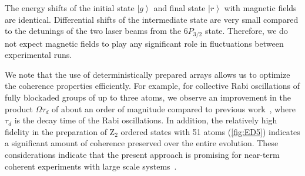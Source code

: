 \documentclass[prl,nobalancelastpage,twocolumn,superscriptaddress,nofootinbib]{revtex4}
\newcommand{\ket}[1]{\left|#1\right\rangle}
\begin{document}
\begin{footnotesize}
\begin{itemize}
The energy shifts of the initial state $\ket{g}$ and final state $\ket{r}$ with
magnetic fields are identical. Differential shifts of the intermediate state
are very small compared to the detunings of the two laser beams from the
$6P_{3/2}$ state. Therefore, we do not expect magnetic fields to play any
significant role in fluctuations between experimental runs.
\end{itemize}

We note that the use of deterministically prepared arrays allows us to
optimize the coherence properties efficiently. For example, for collective Rabi
oscillations of fully blockaded groups of up to three atoms, we observe an
improvement in the product $\Omega\tau_d$ of about an order of magnitude
compared to previous work~\cite{Labuhn2016}, where $\tau_d$ is the decay time
of the Rabi oscillations. In addition, the relatively high fidelity in the
preparation of Z$_2$ ordered states with 51 atoms (\ref{fig:ED5}) indicates a
significant amount of coherence preserved over the entire evolution. These
considerations indicate that the present approach is promising for near-term
coherent experiments with large scale systems~\cite{Boixo2016}.


\end{footnotesize}
\end{document}
